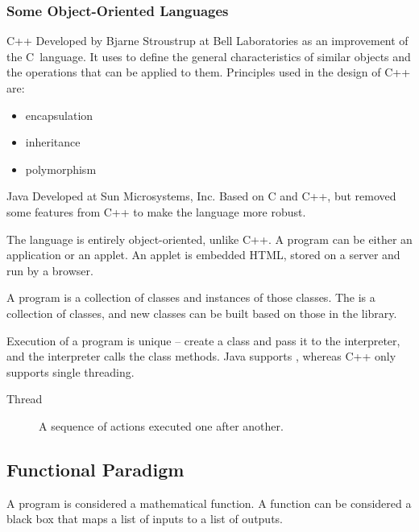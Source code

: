 \documentclass[\main/notes.tex]{subfiles}
\begin{document}
				\subsubsection{Some Object-Oriented Languages}
					\begin{definition}{C++}
						Developed by Bjarne Stroustrup at Bell Laboratories as an improvement of the C~language. It uses  to define the general characteristics of similar objects and the operations that can be applied to them. Principles used in the design of C++ are:
						\begin{itemize}[nosep]
							\item encapsulation
							\item inheritance
							\item polymorphism
						\end{itemize}
					\end{definition}
					\begin{definition}{Java}
						Developed at Sun Microsystems, Inc. Based on C and C++, but removed some features from C++ to make the language more robust.

						The language is entirely object-oriented, unlike C++. A program can be either an application or an applet. An applet is embedded HTML, stored on a server and run by a browser.

						A program is a collection of classes and instances of those classes. The  is a collection of classes, and new classes can be built based on those in the library.

						Execution of a program is unique -- create a class and pass it to the interpreter, and the interpreter calls the class methods. Java supports , whereas C++ only supports single threading.
							\begin{indentparagraph}
								\begin{description}
									\item[Thread] A sequence of actions executed one after another.
								\end{description}
							\end{indentparagraph}
					\end{definition}
			\subsection{Functional Paradigm}
				A program is considered a mathematical function. A function can be considered a black box that maps a list of inputs to a list of outputs.
\end{document}
